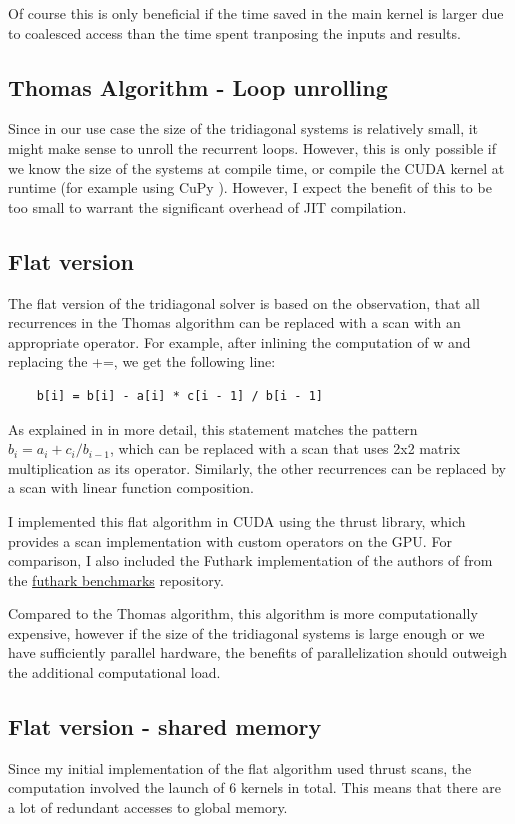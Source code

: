 \documentclass[a4paper,oneside]{memoir}
\begin{document}
Of course this is only beneficial if the time saved in the main kernel is larger due to coalesced access than the time spent tranposing the inputs and results.

\subsection{Thomas Algorithm - Loop unrolling}
Since in our use case the size of the tridiagonal systems is relatively small, it might make sense to unroll the recurrent loops. However, this is only possible if we know the size of the systems at compile time, or compile the CUDA kernel at runtime (for example using CuPy \cite{cupylearningsys2017}). 
However, I expect the benefit of this to be too small to warrant the significant overhead of JIT compilation.

\subsection{Flat version}
The flat version of the tridiagonal solver is based on the observation, 
that all recurrences in the Thomas algorithm can be replaced with a scan with an appropriate operator. 
For example, after inlining the computation of w and replacing the +=, we get the following line: 
\begin{verbatim}
    b[i] = b[i] - a[i] * c[i - 1] / b[i - 1] 
\end{verbatim}
As explained in \cite{andreetta2016finpar} in more detail, this statement matches the pattern $b_i = a_i + c_i / b_{i-1}$, which can be replaced with a scan that uses 2x2 matrix multiplication as its operator.
Similarly, the other recurrences can be replaced by a scan with linear function composition.

I implemented this flat algorithm in CUDA using the thrust library, which provides a scan implementation with custom operators on the GPU.
For comparison, I also included the Futhark implementation of the authors of \cite{andreetta2016finpar} from the 
\href{https://github.com/diku-dk/futhark-benchmarks/blob/bf5112d0841866dc7370586f2e2a7b48467d2d97/finpar/LocVolCalib.fut}{futhark benchmarks}
repository.

Compared to the Thomas algorithm, this algorithm is more computationally expensive, however if the size of the tridiagonal systems is large enough or we have sufficiently parallel hardware, the benefits of parallelization should outweigh the additional computational load.

\subsection{Flat version - shared memory}
Since my initial implementation of the flat algorithm used thrust scans, the computation involved the launch of 6 kernels in total. This means that there are a lot of redundant accesses to global memory. 
\end{document}

